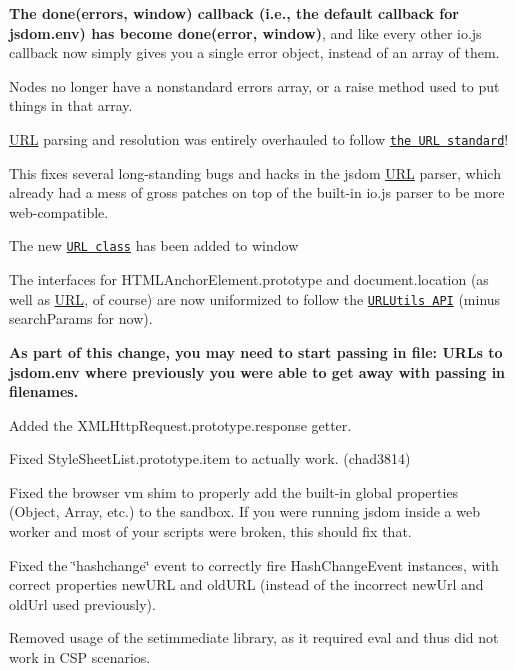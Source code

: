 \begin{DoxyItemize}
\begin{DoxyItemize}
\begin{DoxyItemize}
\item {\bfseries The {\ttfamily done(errors, window)} callback (i.\+e., the default callback for {\ttfamily jsdom.\+env}) has become {\ttfamily done(error, window)}}, and like every other io.\+js callback now simply gives you a single error object, instead of an array of them.
\end{DoxyItemize}
\item Nodes no longer have a nonstandard {\ttfamily errors} array, or a {\ttfamily raise} method used to put things in that array.
\end{DoxyItemize}
\item \mbox{\hyperlink{namespace_u_r_l}{U\+RL}} parsing and resolution was entirely overhauled to follow \href{http://url.spec.whatwg.org/}{\tt the U\+RL standard}!
\begin{DoxyItemize}
\item This fixes several long-\/standing bugs and hacks in the jsdom \mbox{\hyperlink{namespace_u_r_l}{U\+RL}} parser, which already had a mess of gross patches on top of the built-\/in io.\+js parser to be more web-\/compatible.
\item The new \href{https://url.spec.whatwg.org/#url}{\tt {\ttfamily U\+RL} class} has been added to {\ttfamily window}
\item The interfaces for {\ttfamily H\+T\+M\+L\+Anchor\+Element.\+prototype} and {\ttfamily document.\+location} (as well as {\ttfamily \mbox{\hyperlink{namespace_u_r_l}{U\+RL}}}, of course) are now uniformized to follow the \href{https://url.spec.whatwg.org/#api}{\tt {\ttfamily U\+R\+L\+Utils} A\+PI} (minus {\ttfamily search\+Params} for now).
\item {\bfseries As part of this change, you may need to start passing in {\ttfamily file\+:} U\+R\+Ls to {\ttfamily jsdom.\+env} where previously you were able to get away with passing in filenames.}
\end{DoxyItemize}
\item Added the {\ttfamily X\+M\+L\+Http\+Request.\+prototype.\+response} getter.
\item Fixed {\ttfamily Style\+Sheet\+List.\+prototype.\+item} to actually work. (chad3814)
\item Fixed the browser {\ttfamily vm} shim to properly add the built-\/in global properties ({\ttfamily Object}, {\ttfamily Array}, etc.) to the sandbox. If you were running jsdom inside a web worker and most of your scripts were broken, this should fix that.
\item Fixed the {\ttfamily \char`\"{}hashchange\char`\"{}} event to correctly fire {\ttfamily Hash\+Change\+Event} instances, with correct properties {\ttfamily new\+U\+RL} and {\ttfamily old\+U\+RL} (instead of the incorrect {\ttfamily new\+Url} and {\ttfamily old\+Url} used previously).
\item Removed usage of the setimmediate library, as it required {\ttfamily eval} and thus did not work in C\+SP scenarios.
\end{DoxyItemize}

